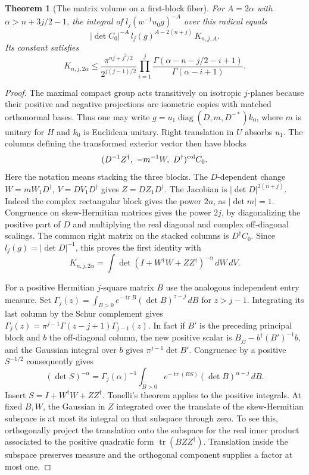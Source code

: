 \documentclass[a4paper,11pt]{article}
\newtheorem{theorem}[proposition]{Theorem}
\theoremstyle{definition}
\theoremstyle{remark}
\numberwithin{equation}{section}
\begin{document}
\begin{theorem}[The matrix volume on a first-block fiber]\leavevmode
\label{thm:matrixfiber295}
For \(A=2\alpha\) with \(\alpha>n+3j/2-1\), the integral
of \(l_j(w^{-1}u_0g)^{-A}\) over this radical equals
\[
        |\det C_0|^{-A}\,l_j(g)^{A-2(n+j)}\,K_{n,j,A}.
\]
Its constant satisfies
\[
 K_{n,j,2\alpha}\le
 \frac{\pi^{nj+j^2/2}}{2^{j(j-1)/2}}
 \prod_{i=1}^j
   \frac{\Gamma(\alpha-n-j/2-i+1)}
        {\Gamma(\alpha-i+1)} .
\]
\end{theorem}
\begin{proof}
The maximal compact group acts transitively on isotropic
\(j\)-planes because their positive and negative projections
are isometric copies with matched orthonormal bases.
Thus one may write
\(g=u_1\operatorname{diag}(D,m,D^{-*})k_0\), where
\(m\) is unitary for \(H\) and \(k_0\) is Euclidean
unitary. Right translation in \(U\) absorbs \(u_1\).
The columns defining the transformed exterior vector
then have blocks
\[
       (D^{-1}Z^\dagger,\ -m^{-1}W,\ D^\dagger)^{\rm col}
                    C_0 .
\]
Here the notation means stacking the three blocks.
The \(D\)-dependent change \(W=m W_1 D^\dagger\),
\(V=D V_1D^\dagger\) gives \(Z=D Z_1D^\dagger\).
The Jacobian is \(|\det D|^{2(n+j)}\). Indeed the
complex rectangular block gives the power \(2n\), as
\(|\det m|=1\). Congruence on skew-Hermitian matrices
gives the power \(2j\), by diagonalizing the positive
part of \(D\) and multiplying the real diagonal and
complex off-diagonal scalings. The common right matrix
on the stacked columns is \(D^\dagger C_0\). Since
\(l_j(g)=|\det D|^{-1}\), this proves the first identity
with
\[
 K_{n,j,2\alpha}
  =\int\det(I+W^\dagger W+ZZ^\dagger)^{-\alpha}\,dW\,dV .
\]

For a positive Hermitian \(j\)-square matrix \(B\) use
the analogous independent entry measure. Set
\(\Gamma_j(z)=\int_{B>0}e^{-\operatorname{tr}B}
(\det B)^{z-j}\,dB\) for \(z>j-1\).
Integrating its last column by the Schur complement gives
\(\Gamma_j(z)=\pi^{j-1}\Gamma(z-j+1)\Gamma_{j-1}(z)\).
In fact if \(B'\) is the preceding principal block and
\(b\) the off-diagonal column, the new positive scalar is
\(B_{jj}-b^\dagger (B')^{-1}b\), and the Gaussian integral
over \(b\) gives \(\pi^{j-1}\det B'\). Congruence by a
positive \(S^{-1/2}\) consequently gives
\[
 (\det S)^{-\alpha}
   =\Gamma_j(\alpha)^{-1}
    \int_{B>0}e^{-\operatorname{tr}(BS)}
                        (\det B)^{\alpha-j}\,dB .
\]
Insert \(S=I+W^\dagger W+ZZ^\dagger\). Tonelli's
theorem applies to the positive integrals. At fixed
\(B,W\), the Gaussian in \(Z\) integrated over the
translate of the skew-Hermitian subspace is at most its
integral on that subspace through zero. To see this,
orthogonally project the translation onto the subspace
for the real inner product associated to the positive
quadratic form \(\operatorname{tr}(BZZ^\dagger)\).
Translation inside the subspace preserves measure and
the orthogonal component supplies a factor at most one.


\end{proof}
\end{document}
